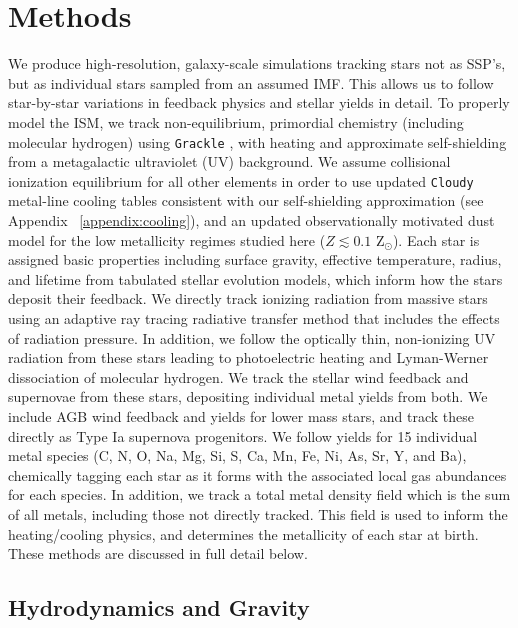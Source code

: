 \documentclass[twocolumn]{aastex61}
\begin{document}
\section{Methods}
\label{sec:methods}
We produce high-resolution, galaxy-scale simulations tracking stars not as SSP's, but as individual stars sampled from an assumed IMF.
This allows us to follow star-by-star variations in feedback physics and stellar yields in detail. To properly model the ISM, we track non-equilibrium, primordial chemistry (including molecular hydrogen) using \texttt{Grackle} \citep{GrackleMethod}, with heating and approximate self-shielding from a metagalactic ultraviolet (UV) background. We 
    assume collisional ionization equilibrium for all other elements in order to
use updated \texttt{Cloudy} metal-line cooling tables consistent with our self-shielding approximation (see Appendix ~\ref{appendix:cooling}), and an updated observationally motivated dust model for the low metallicity regimes studied here ($Z \lesssim 0.1$ Z$_{\odot}$). Each star is assigned basic properties including surface gravity, effective temperature, radius, and lifetime from tabulated stellar evolution models, which inform how the stars deposit their feedback. We directly track ionizing radiation from massive stars using an adaptive ray tracing radiative transfer method that includes the effects of radiation pressure. In addition, we follow the optically thin, non-ionizing UV radiation from these stars leading to photoelectric heating and Lyman-Werner dissociation of molecular hydrogen. We track the stellar wind feedback and supernovae from these stars, depositing individual metal yields from both. We include AGB wind feedback and yields for lower mass stars, and track these directly as Type Ia supernova progenitors. We follow yields for 15 individual metal species (C, N, O, Na, Mg, Si, S, Ca, Mn, Fe, Ni, As, Sr, Y, and Ba), chemically tagging each star
   as it forms
with the associated local gas abundances for each species. In addition, we track a total metal density field which is the sum of all metals, including those not directly tracked. This field is used to inform the heating/cooling physics, and determines the metallicity of each star at birth. These methods are discussed in full detail below.

\subsection{Hydrodynamics and Gravity}
\label{sec:hydro}
\end{document}

